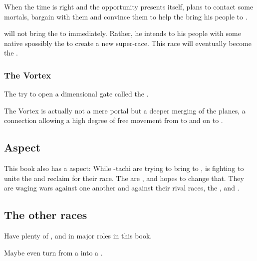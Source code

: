 When the time is right and the opportunity presents itself, \Daggerrain{} plans to contact some \Miithian{} mortals, bargain with them and convince them to help the \banelord{} bring his people to \Miith{}. 

\Daggerrain{} will not bring the \banes{} to \Miith{} immediately. Rather, he intends to  his people with some native \Miithian{}s\dash possibly the \nephilim\dash to create a new super-race. This race will eventually become the . 





\subsubsection{The Vortex}
The \banes{} try to open a dimensional gate called the . 

The Vortex is actually not a mere portal but a deeper merging of the planes, a connection allowing a high degree of free movement from \Erebos{} to \Nyx{} and on to \Miith{}. 









\subsection{\Draconian{} Aspect}
This book also has a \draconian{} aspect: 
While \Semiza-tachi are trying to bring \banes{} to \Miith{}, \Nexagglachel{} is fighting to unite the \dragons{} and reclaim \Miith{} for their race. 
The \dragons{} are , and \Nexagglachel{} hopes to change that. 
They are waging wars against one another and against their rival races, the \quiljaaran, \vorcanths{} and \nagae. 









\subsection{The other races}
Have plenty of \aryothim, \vorcanths{} and \quiljaaran{} in major roles in this book. 

Maybe even turn \Vexstrasshin{} from a \dragon{} into a \quiljaar. 









